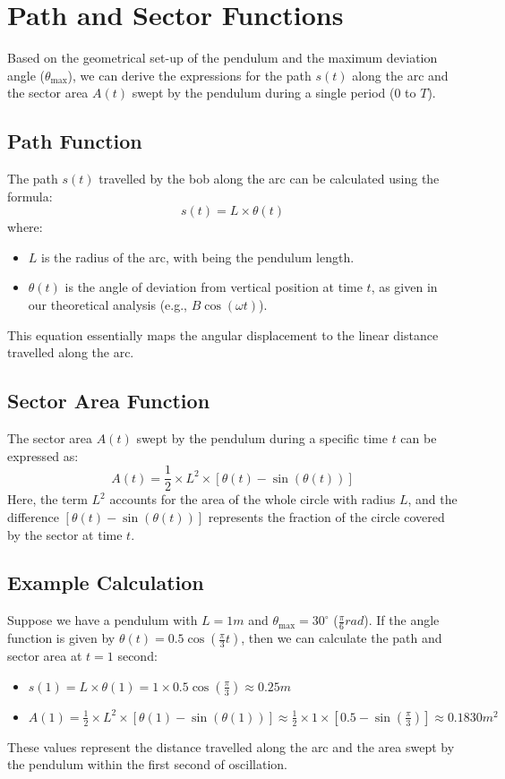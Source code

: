 \section{Path and Sector Functions}

Based on the geometrical set-up of the pendulum and the maximum deviation angle ($\theta_{\max}$), we can derive the expressions for the path $s(t)$ along the arc and the sector area $A(t)$ swept by the pendulum during a single period ($0$ to $T$).

\newpage
\thispagestyle{plain}

\subsection{Path Function}

The path $s(t)$ travelled by the bob along the arc can be calculated using the formula: 
	\[s(t) = L \times \theta (t)\] 
where:

\begin{itemize}
	\item $L$ is the radius of the arc, with being the pendulum length.
	\item $\theta (t)$ is the angle of deviation from vertical position at time $t$, as given in our theoretical analysis (e.g., $B\cos(\omega t)$).
\end{itemize}

This equation essentially maps the angular displacement to the linear distance travelled along the arc.

\subsection{Sector Area Function}

The sector area $A(t)$ swept by the pendulum during a specific time $t$ can be expressed as: 
	\[A(t) = \frac{1}{2} \times L^{2} \times [\theta (t) - \sin(\theta (t))]\] 
Here, the term $L^{2}$ accounts for the area of the whole circle with radius $L$, and the difference $[\theta (t) - \sin(\theta (t))]$ represents the fraction of the circle covered by the sector at time $t$.

\subsection{Example Calculation}

Suppose we have a pendulum with $L = 1m$ and $\theta_{\max} = 30^{\circ}$ ($\frac{\pi}{6}rad$). If the angle function is given by $\theta (t) = 0.5\cos(\frac{\pi}{3}t)$, then we can calculate the path and sector area at $t = 1$ second:

\begin{itemize}
	\item $s(1) = L \times \theta (1) = 1 \times 0.5\cos(\frac{\pi}{3}) \approx 0.25m$
	\item $A(1) = \frac{1}{2} \times L^{2} \times [\theta (1) - \sin(\theta (1))] \approx \frac{1}{2} \times 1 \times [0.5 - \sin(\frac{\pi}{3})] \approx 0.1830m^{2}$
\end{itemize}

\noindent These values represent the distance travelled along the arc and the area swept by the pendulum within the first second of oscillation.
